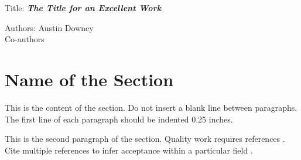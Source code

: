 \documentclass[12pt,letterpaper,onecolumn]{article}
\begin{document}
\begin{titlepage}
	{\noindent Title: {\bf \textit{ The Title for an Excellent Work}} }
	\vspace{1\baselineskip}

	{\noindent Authors: \hspace{4ex} Austin Downey \\}
	{\indent \hspace{10.5ex} Co-authors}
	\vspace{1\baselineskip}

\end{titlepage}

\vspace*{8cm}
\thispagestyle{specialfooter}
\enlargethispage{-2\baselineskip} %


\begin{abstract}
This is the abstract. The purpose of this \LaTeX \hspace{1ex} template is to assist others in preparing manuscripts for the International Workshop on Structural Health Monitoring (IWSHM).  I have tried to accuracy reproduce the Microsoft Word template for the Proceedings of {\bf 9th International Workshop on Structural Health Monitoring 2013}, however, this work is not affiliated with the organizers of the IWSHM conferences. Please contact me with any changes or concerns, {austindowney@gmail.com}. The Microsoft Word template can be found in the downloaded the same folder at this \LaTeX \hspace{1ex} template and should be read on its own. Additionally, IWSHM requires a cover sheet and a copyright release form that can also be found in the provided Word document template.
\end{abstract}

\section{Name of the Section}

This is the content of the section. Do not insert a blank line between paragraphs. The first line of each paragraph should be indented 0.25 inches. 

This is the second paragraph of the section. Quality work requires references \cite{Downey2016Reconstructionplanestrain}.  Cite multiple references to infer acceptance within a particular field \cite{Yao2015Detectionsteelfatigue,Loh2009CarbonNanotubeSensing}.
\end{document}
